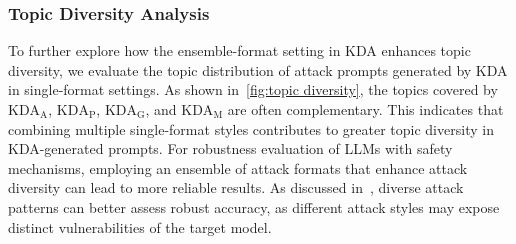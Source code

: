 


\subsubsection{Topic Diversity Analysis} To further explore how the ensemble-format setting in KDA enhances topic diversity, we evaluate the topic distribution of attack prompts generated by KDA in single-format settings. As shown in~\autoref{fig:topic diversity}, the topics covered by $\text{KDA}_\text{A}$, $\text{KDA}_\text{P}$, $\text{KDA}_\text{G}$, and $\text{KDA}_\text{M}$ are often complementary. This indicates that combining multiple single-format styles contributes to greater topic diversity in KDA-generated prompts. For robustness evaluation of LLMs with safety mechanisms, employing an ensemble of attack formats that enhance attack diversity can lead to more reliable results. As discussed in~\citet{liang_implications_2023, liang_optimization_2023}, diverse attack patterns can better assess robust accuracy, as different attack styles may expose distinct vulnerabilities of the target model.








